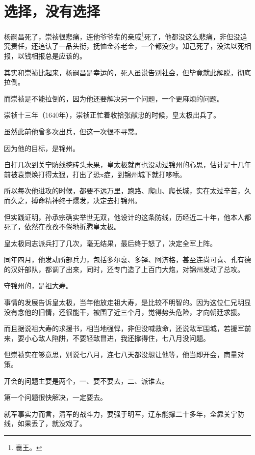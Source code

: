 \section{选择，没有选择}
\ifnum{}
	\begin{multicols}{\theparacolNo}
		\fi
		杨嗣昌死了，崇祯很悲痛，连他爷爷辈的亲戚\footnote{襄王。}死了，他都没这么悲痛，非但没追究责任，还追认了一品头衔，抚恤金养老金，一个都没少。知己死了，没法以死相报，以钱相报总是应该的。

		其实和崇祯比起来，杨嗣昌是幸运的，死人虽说告别社会，但毕竟就此解脱，彻底拉倒。

		而崇祯是不能拉倒的，因为他还要解决另一个问题，一个更麻烦的问题。

		崇祯十三年（1640年），崇祯正忙着收拾张献忠的时候，皇太极出兵了。

		虽然此前他曾多次出兵，但这一次很不寻常。

		因为他的目标，是锦州。

		自打几次到关宁防线挖砖头未果，皇太极就再也没动过锦州的心思，估计是十几年前被袁崇焕打得太狠，打出了恐x症，到锦州城下就打哆嗦。

		所以每次他进攻的时候，都要不远万里，跑路、爬山、爬长城，实在太过辛苦，久而久之，搏命精神终于爆发，决定去打锦州。

		但实践证明，孙承宗确实举世无双，他设计的这条防线，历经近二十年，他本人都死了，依然在孜孜不倦地折腾皇太极。

		皇太极同志派兵打了几次，毫无结果，最后终于怒了，决定全军上阵。

		同年四月，他发动所部兵力，包括多尔衮、多铎、阿济格，甚至连尚可喜、孔有德的汉奸部队，都调了出来，同时，还专门造了上百门大炮，对锦州发动了总攻。

		守锦州的，是祖大寿。

		事情的发展告诉皇太极，当年他放走祖大寿，是比较不明智的。因为这位仁兄明显没有念他的旧情，还很能干，被围了近三个月，觉得势头危险，才向朝廷求援。

		而且据说祖大寿的求援书，相当地强悍，非但没喊救命，还说敌军围城，若援军前来，要小心敌人陷阱，不要轻敌冒进，我还撑得住，七八月没问题。

		但崇祯实在够意思，别说七八月，连七八天都没想让他等，他当即开会，商量对策。

		开会的问题主要是两个，一、要不要去，二、派谁去。

		第一个问题很快解决，一定要去。

		就军事实力而言，清军的战斗力，要强于明军，辽东能撑二十多年，全靠关宁防线，如果丢了，就没戏了。


\end{multicols}
